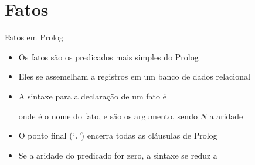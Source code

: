 \section{Fatos}

\begin{frame}[fragile]{Fatos em Prolog}

    \begin{itemize}
        \item Os fatos são os predicados mais simples do Prolog

        \item Eles se assemelham a registros em um banco de dados relacional

        \item A sintaxe para a declaração de um fato é


        onde  é o nome do fato, e 
        são os argumento, sendo $N$ a aridade

        \item O ponto final (`\texttt{.}') encerra todas as cláusulas de Prolog

        \item Se a aridade do predicado for zero, a sintaxe se reduz a


    \end{itemize}

\end{frame}

